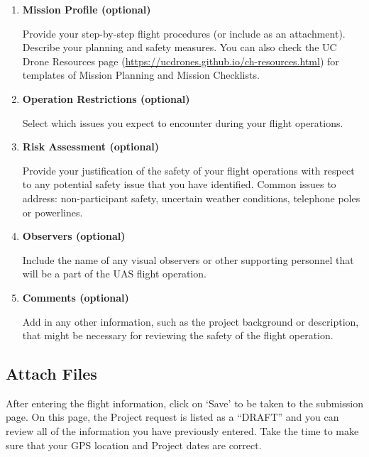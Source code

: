\documentclass[
]{book}
\begin{document}
\begin{enumerate}
\def\labelenumi{\arabic{enumi}.}
\setcounter{enumi}{14}
\item
  \textbf{Mission Profile (optional)}

  Provide your step-by-step flight procedures (or include as an attachment). Describe your planning and safety measures. You can also check the UC Drone Resources page (\url{https://ucdrones.github.io/ch-resources.html}) for templates of Mission Planning and Mission Checklists.
\item
  \textbf{Operation Restrictions (optional)}

  Select which issues you expect to encounter during your flight operations.
\item
  \textbf{Risk Assessment (optional)}

  Provide your justification of the safety of your flight operations with respect to any potential safety issue that you have identified. Common issues to address: non-participant safety, uncertain weather conditions, telephone poles or powerlines.
\item
  \textbf{Observers (optional)}

  Include the name of any visual observers or other supporting personnel that will be a part of the UAS flight operation.
\item
  \textbf{Comments (optional)}

  Add in any other information, such as the project background or description, that might be necessary for reviewing the safety of the flight operation.
\end{enumerate}

\hypertarget{attach-files}{%
\subsection{Attach Files}\label{attach-files}}

After entering the flight information, click on `Save' to be taken to the submission page. On this page, the Project request is listed as a ``DRAFT'' and you can review all of the information you have previously entered. Take the time to make sure that your GPS location and Project dates are correct.
\end{document}
